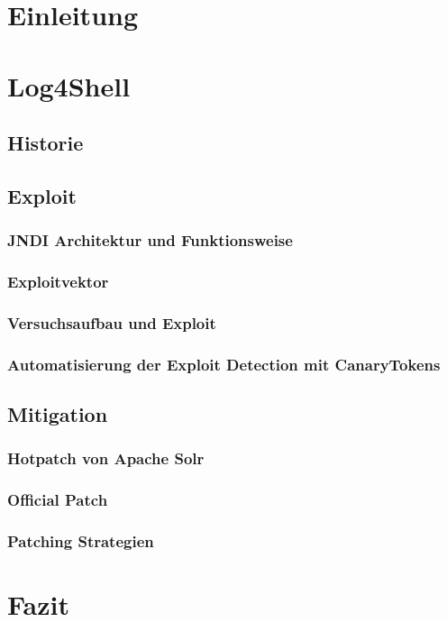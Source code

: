 

\section{Einleitung}
\section{Log4Shell}
\subsection{Historie}



\subsection{Exploit}
\subsubsection{JNDI Architektur und Funktionsweise}
\subsubsection{Exploitvektor}
\subsubsection{Versuchsaufbau und Exploit}
\subsubsection{Automatisierung der Exploit Detection mit CanaryTokens}
\subsection{Mitigation}

\subsubsection{Hotpatch von Apache Solr}
\subsubsection{Official Patch}
\subsubsection{Patching Strategien}
\section{Fazit}

%
